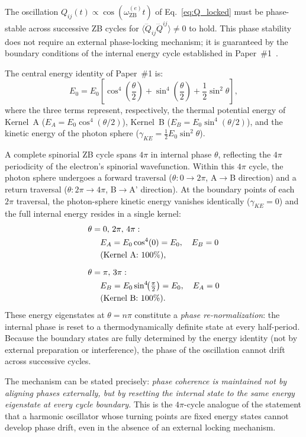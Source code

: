 \documentclass[%
 reprint, amsmath,amssymb, aps, prd, ]{revtex4-2}
\numberwithin{equation}{section}
\newcommand{\iphase}{\theta}
\newcommand{\omZBe}{\omega_{\mathrm{ZB}}^{(e)}}
\begin{document}
The oscillation $Q_{ij}(t) \propto \cos(\omZBe t)$ of Eq.~\eqref{eq:Q_locked} must be phase-stable across successive ZB cycles for $\langle\dddot{Q}_{ij}\dddot{Q}^{ij}\rangle \neq 0$ to hold.
This phase stability does not require an external phase-locking mechanism; it is guaranteed by the boundary conditions of the internal energy cycle established in Paper~\#1~\cite{hanamura01}.

The central energy identity of Paper~\#1 is:
\begin{equation}
E_0 = E_0\!\left[\cos^4\!\!\left(\frac{\iphase}{2}\right) + \sin^4\!\!\left(\frac{\iphase}{2}\right) + \frac{1}{2}\sin^2\!\iphase\right],
\label{eq:energy_identity}
\end{equation}
where the three terms represent, respectively, the thermal potential energy of Kernel~A ($E_A = E_0\cos^4(\iphase/2)$), Kernel~B ($E_B = E_0\sin^4(\iphase/2)$), and the kinetic energy of the photon sphere ($\gamma_{KE} = \frac{1}{2}E_0\sin^2\iphase$).

A complete spinorial ZB cycle spans $4\pi$ in internal phase $\iphase$, reflecting the $4\pi$ periodicity of the electron's spinorial wavefunction.
Within this $4\pi$ cycle, the photon sphere undergoes a forward traversal ($\iphase: 0 \to 2\pi$, A$\to$B direction) and a return traversal ($\iphase: 2\pi \to 4\pi$, B$\to$A' direction).
At the boundary points of each $2\pi$ traversal, the photon-sphere kinetic energy vanishes identically ($\gamma_{KE} = 0$) and the full internal energy resides in a single kernel:
\begin{align}
\iphase &= 0,\, 2\pi,\, 4\pi:
\notag\\
&\quad E_A = E_0\cos^4(0) = E_0,\quad E_B = 0
\notag\\
&\quad\text{(Kernel A: 100\%),}
\label{eq:boundary_A}\\[6pt]
\iphase &= \pi,\, 3\pi:
\notag\\
&\quad E_B = E_0\sin^4\!\!\left(\tfrac{\pi}{2}\right) = E_0,\quad E_A = 0
\notag\\
&\quad\text{(Kernel B: 100\%).}
\label{eq:boundary_B}
\end{align}
These energy eigenstates at $\iphase = n\pi$ constitute a \emph{phase re-normalization}: the internal phase is reset to a thermodynamically definite state at every half-period.
Because the boundary states are fully determined by the energy identity (not by external preparation or interference), the phase of the oscillation cannot drift across successive cycles.

The mechanism can be stated precisely: \emph{phase coherence is maintained not by aligning phases externally, but by resetting the internal state to the same energy eigenstate at every cycle boundary.}
This is the $4\pi$-cycle analogue of the statement that a harmonic oscillator whose turning points are fixed energy states cannot develop phase drift, even in the absence of an external locking mechanism.
\end{document}
